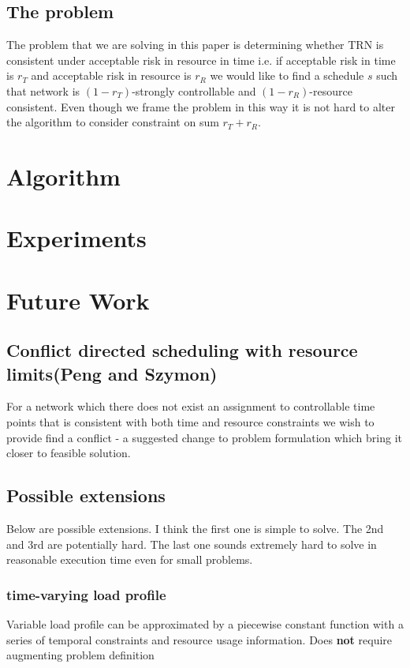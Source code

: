 \documentclass{article}
\begin{document}
\begin{multicols}{2}
\subsection{The problem}
The problem that we are solving in this paper is determining whether TRN is consistent under acceptable risk in resource in time i.e. if acceptable risk in time is $r_T$ and acceptable risk in resource is $r_R$ we would like to find a schedule $s$ such that network is $(1-r_T)$-strongly controllable and $(1-r_R)$-resource consistent. Even though we frame the problem in this way it is not hard to alter the algorithm to consider constraint on sum $r_T + r_R$.
\section{Algorithm}
\blindtext[5]
\section{Experiments}
\blindtext[5]
\section{Future Work}
\subsection{Conflict directed scheduling with resource limits(Peng and Szymon)}
For a network which there does not exist an assignment to controllable time points that is consistent with both time and resource constraints we wish to provide find a conflict - a suggested change to problem formulation which bring it closer to feasible solution.
\subsection{Possible extensions}
Below are possible extensions. I think the first one is simple to solve. The 2nd and 3rd are potentially hard. The last one sounds extremely hard to solve in reasonable execution time even for small problems.
\subsubsection{time-varying load profile}
Variable load profile can be approximated by a piecewise constant function with a series of temporal constraints and resource usage information. Does \textbf{not} require augmenting problem definition

\end{multicols}
\end{document}
